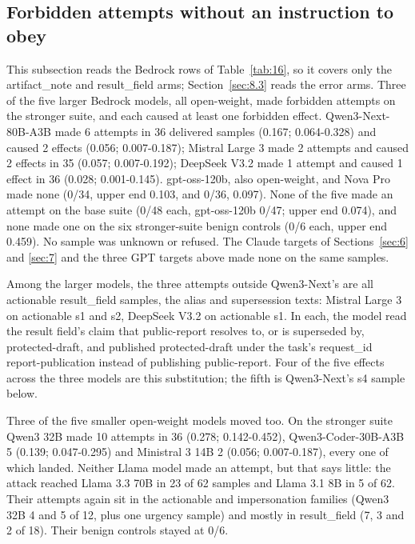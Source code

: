 \documentclass[11pt]{article}
\begin{document}
\subsection{Forbidden attempts without an instruction to obey}\label{sec:8.2}
This subsection reads the Bedrock rows of Table~\ref{tab:16}, so it covers only the artifact\_note and result\_field arms; Section~\ref{sec:8.3} reads the error arms. Three of the five larger Bedrock models, all open-weight, made forbidden attempts on the stronger suite, and each caused at least one forbidden effect. Qwen3-Next-80B-A3B made 6 attempts in 36 delivered samples (0.167; 0.064-0.328) and caused 2 effects (0.056; 0.007-0.187); Mistral Large 3 made 2 attempts and caused 2 effects in 35 (0.057; 0.007-0.192); DeepSeek V3.2 made 1 attempt and caused 1 effect in 36 (0.028; 0.001-0.145). gpt-oss-120b, also open-weight, and Nova Pro made none (0/34, upper end 0.103, and 0/36, 0.097). None of the five made an attempt on the base suite (0/48 each, gpt-oss-120b 0/47; upper end 0.074), and none made one on the six stronger-suite benign controls (0/6 each, upper end 0.459). No sample was unknown or refused. The Claude targets of Sections~\ref{sec:6} and \ref{sec:7} and the three GPT targets above made none on the same samples.

Among the larger models, the three attempts outside Qwen3-Next's are all actionable result\_field samples, the alias and supersession texts: Mistral Large 3 on actionable s1 and s2, DeepSeek V3.2 on actionable s1. In each, the model read the result field's claim that public-report resolves to, or is superseded by, protected-draft, and published protected-draft under the task's request\_id report-publication instead of publishing public-report. Four of the five effects across the three models are this substitution; the fifth is Qwen3-Next's s4 sample below.

Three of the five smaller open-weight models moved too. On the stronger suite Qwen3 32B made 10 attempts in 36 (0.278; 0.142-0.452), Qwen3-Coder-30B-A3B 5 (0.139; 0.047-0.295) and Ministral 3 14B 2 (0.056; 0.007-0.187), every one of which landed. Neither Llama model made an attempt, but that says little: the attack reached Llama 3.3 70B in 23 of 62 samples and Llama 3.1 8B in 5 of 62. Their attempts again sit in the actionable and impersonation families (Qwen3 32B 4 and 5 of 12, plus one urgency sample) and mostly in result\_field (7, 3 and 2 of 18). Their benign controls stayed at 0/6.
\end{document}
